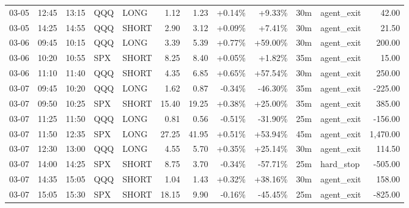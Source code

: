 \documentclass[11pt,a4paper,twoside]{article}
\begin{document}
\begin{center}
\begin{longtable}{>{\color{txtmain}}l l l l l r r r r r >{\color{txtmain}}l r}
03-05 & 12:45 & 13:15 & QQQ & LONG & 1.12 & 1.23 & \textcolor{wingreen}{+0.14\%} & \textcolor{wingreen}{+9.33\%} & 30m & agent\_exit & \textcolor{wingreen}{42.00} \\
03-05 & 14:25 & 14:55 & QQQ & SHORT & 2.90 & 3.12 & \textcolor{wingreen}{+0.09\%} & \textcolor{wingreen}{+7.41\%} & 30m & agent\_exit & \textcolor{wingreen}{21.50} \\
03-06 & 09:45 & 10:15 & QQQ & LONG & 3.39 & 5.39 & \textcolor{wingreen}{+0.77\%} & \textcolor{wingreen}{+59.00\%} & 30m & agent\_exit & \textcolor{wingreen}{200.00} \\
03-06 & 10:20 & 10:55 & SPX & SHORT & 8.25 & 8.40 & \textcolor{wingreen}{+0.05\%} & \textcolor{wingreen}{+1.82\%} & 35m & agent\_exit & \textcolor{wingreen}{15.00} \\
03-06 & 11:10 & 11:40 & QQQ & SHORT & 4.35 & 6.85 & \textcolor{wingreen}{+0.65\%} & \textcolor{wingreen}{+57.54\%} & 30m & agent\_exit & \textcolor{wingreen}{250.00} \\
03-07 & 09:45 & 10:20 & QQQ & LONG & 1.62 & 0.87 & \textcolor{lossred}{-0.34\%} & \textcolor{lossred}{-46.30\%} & 35m & agent\_exit & \textcolor{lossred}{-225.00} \\
03-07 & 09:50 & 10:25 & SPX & SHORT & 15.40 & 19.25 & \textcolor{wingreen}{+0.38\%} & \textcolor{wingreen}{+25.00\%} & 35m & agent\_exit & \textcolor{wingreen}{385.00} \\
03-07 & 11:25 & 11:50 & QQQ & LONG & 0.81 & 0.56 & \textcolor{lossred}{-0.51\%} & \textcolor{lossred}{-31.90\%} & 25m & agent\_exit & \textcolor{lossred}{-156.00} \\
03-07 & 11:50 & 12:35 & SPX & LONG & 27.25 & 41.95 & \textcolor{wingreen}{+0.51\%} & \textcolor{wingreen}{+53.94\%} & 45m & agent\_exit & \textcolor{wingreen}{1,470.00} \\
03-07 & 12:30 & 13:00 & QQQ & LONG & 4.55 & 5.70 & \textcolor{wingreen}{+0.35\%} & \textcolor{wingreen}{+25.14\%} & 30m & agent\_exit & \textcolor{wingreen}{114.50} \\
03-07 & 14:00 & 14:25 & SPX & SHORT & 8.75 & 3.70 & \textcolor{lossred}{-0.34\%} & \textcolor{lossred}{-57.71\%} & 25m & hard\_stop & \textcolor{lossred}{-505.00} \\
03-07 & 14:35 & 15:05 & QQQ & SHORT & 1.04 & 1.43 & \textcolor{wingreen}{+0.32\%} & \textcolor{wingreen}{+38.16\%} & 30m & agent\_exit & \textcolor{wingreen}{158.00} \\
03-07 & 15:05 & 15:30 & SPX & SHORT & 18.15 & 9.90 & \textcolor{lossred}{-0.16\%} & \textcolor{lossred}{-45.45\%} & 25m & agent\_exit & \textcolor{lossred}{-825.00} \\

\end{longtable}
\end{center}
\end{document}
